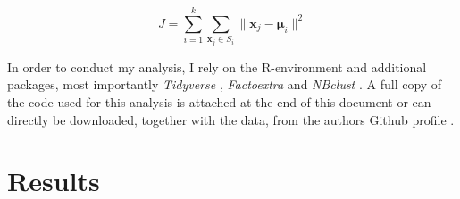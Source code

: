 \documentclass{article}[hidelinks]
\begin{document}
\begin{equation}\label{my_first_eqn}
	J=\sum _{{i=1}}^{{k}}\sum _{{{\mathbf  x}_{j}\in S_{{i}}}}{\|{\mathbf  x}_{j}-{\boldsymbol  \mu }_{i}\|^{2}}
\end{equation}


In order to conduct my analysis, I rely on the R-environment \citep{R} and additional packages, most importantly \emph{Tidyverse} \citep{tidy}, \emph{Factoextra} \citep{factoextra} and \emph{NBclust} \citep{NBclust}. A full copy of the code used for this analysis is attached at the end of this document or can directly be downloaded, together with the data, from the authors Github profile \citep{Github}.

\section{Results}
\end{document}
